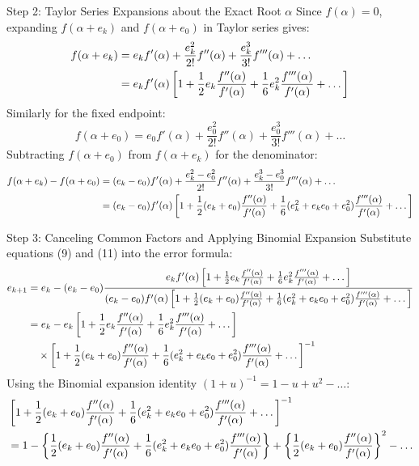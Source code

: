 \documentclass[11pt,a4paper]{article}
\begin{document}
\begin{exbox}{Step 2: Taylor Series Expansions about the Exact Root $\alpha$}
Since $f(\alpha) = 0$, expanding $f(\alpha + e_k)$ and $f(\alpha + e_0)$ in Taylor series gives:
\begin{align}
    f(\alpha + e_k) &= e_k f'(\alpha) + \frac{e_k^2}{2!} f''(\alpha) + \frac{e_k^3}{3!} f'''(\alpha) + \dots \notag \\
    &= e_k f'(\alpha) \left[ 1 + \frac{1}{2} e_k \frac{f''(\alpha)}{f'(\alpha)} + \frac{1}{6} e_k^2 \frac{f'''(\alpha)}{f'(\alpha)} + \dots \right]
\end{align}
Similarly for the fixed endpoint:
\begin{equation}
    f(\alpha + e_0) = e_0 f'(\alpha) + \frac{e_0^2}{2!} f''(\alpha) + \frac{e_0^3}{3!} f'''(\alpha) + \dots
\end{equation}
Subtracting $f(\alpha + e_0)$ from $f(\alpha + e_k)$ for the denominator:
\begin{align}
    f(\alpha + e_k) - f(\alpha + e_0) &= (e_k - e_0) f'(\alpha) + \frac{e_k^2 - e_0^2}{2!} f''(\alpha) + \frac{e_k^3 - e_0^3}{3!} f'''(\alpha) + \dots \notag \\
    &= (e_k - e_0) f'(\alpha) \left[ 1 + \frac{1}{2}(e_k + e_0)\frac{f''(\alpha)}{f'(\alpha)} + \frac{1}{6}(e_k^2 + e_k e_0 + e_0^2)\frac{f'''(\alpha)}{f'(\alpha)} + \dots \right]
\end{align}
\end{exbox}

\newpage

\begin{exbox}{Step 3: Canceling Common Factors and Applying Binomial Expansion}
Substitute equations (9) and (11) into the error formula:
\begin{align}
    e_{k+1} &= e_k - (e_k - e_0) \frac{e_k f'(\alpha) \left[ 1 + \frac{1}{2} e_k \frac{f''(\alpha)}{f'(\alpha)} + \frac{1}{6} e_k^2 \frac{f'''(\alpha)}{f'(\alpha)} + \dots \right]}{(e_k - e_0) f'(\alpha) \left[ 1 + \frac{1}{2}(e_k + e_0)\frac{f''(\alpha)}{f'(\alpha)} + \frac{1}{6}(e_k^2 + e_k e_0 + e_0^2)\frac{f'''(\alpha)}{f'(\alpha)} + \dots \right]} \notag \\
    &= e_k - e_k \left[ 1 + \frac{1}{2} e_k \frac{f''(\alpha)}{f'(\alpha)} + \frac{1}{6} e_k^2 \frac{f'''(\alpha)}{f'(\alpha)} + \dots \right] \notag \\
    &\quad \times \left[ 1 + \frac{1}{2}(e_k + e_0)\frac{f''(\alpha)}{f'(\alpha)} + \frac{1}{6}(e_k^2 + e_k e_0 + e_0^2)\frac{f'''(\alpha)}{f'(\alpha)} + \dots \right]^{-1}
\end{align}
Using the Binomial expansion identity $(1 + u)^{-1} = 1 - u + u^2 - \dots$:
\begin{align}
    &\left[ 1 + \frac{1}{2}(e_k + e_0)\frac{f''(\alpha)}{f'(\alpha)} + \frac{1}{6}(e_k^2 + e_k e_0 + e_0^2)\frac{f'''(\alpha)}{f'(\alpha)} + \dots \right]^{-1} \notag \\
    &= 1 - \left\{ \frac{1}{2}(e_k + e_0)\frac{f''(\alpha)}{f'(\alpha)} + \frac{1}{6}(e_k^2 + e_k e_0 + e_0^2)\frac{f'''(\alpha)}{f'(\alpha)} \right\} + \left\{ \frac{1}{2}(e_k + e_0)\frac{f''(\alpha)}{f'(\alpha)} \right\}^2 - \dots
\end{align}
\end{exbox}
\end{document}
